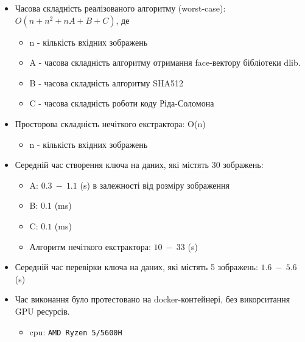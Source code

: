 \documentclass[11pt]{article}
\providecommand{\tightlist}{%
      \setlength{\itemsep}{0pt}\setlength{\parskip}{0pt}}
\begin{document}
\begin{itemize}
\tightlist
\item
  Часова складність реалізованого алгоритму (worst-case):
  \(O(n+n^2+nA+B+C)\), де

  \begin{itemize}
  \tightlist
  \item
    n - кількість вхідних зображень
  \item
    A - часова складність алгоритму отримання face-вектору бібліотеки
    dlib.
  \item
    B - часова складність алгоритму SHA512
  \item
    C - часова складність роботи коду Ріда-Соломона
  \end{itemize}
\item
  Просторова складність нечіткого екстрактора: O(n)

  \begin{itemize}
  \tightlist
  \item
    n - кількість вхідних зображень
  \end{itemize}
\item
  Середній час створення ключа на даних, які містять 30 зображень:

  \begin{itemize}
  \tightlist
  \item
    A: \(0.3~-~1.1\) (s) в залежності від розміру зображення
  \item
    B: \(0.1\) (ms)
  \item
    C: \(0.1\) (ms)
  \item
    Алгоритм нечіткого екстрактора: \(10~-~33\) (s)
  \end{itemize}
\item
  Середній час перевірки ключа на даних, які містять 5 зображень:
  \(1.6~-~5.6\) (s)
\item
  Час виконання було протестовано на docker-контейнері, без викорситання
  GPU ресурсів.

  \begin{itemize}
  \tightlist
  \item
    cpu: \texttt{AMD\ Ryzen\ 5/5600H}
  \end{itemize}
\end{itemize}
\end{document}
